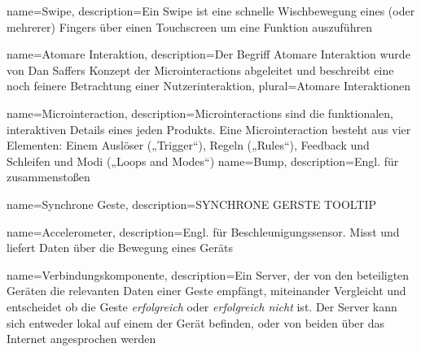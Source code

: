 {
    name=Swipe,
    description={Ein Swipe ist eine schnelle Wischbewegung eines (oder 				mehrerer) Fingers über einen Touchscreen um eine Funktion auszuführen}
}

{
    name=Atomare Interaktion,
    description={Der Begriff Atomare Interaktion wurde von Dan Saffers Konzept 		der Microinteractions abgeleitet und beschreibt eine noch feinere 				Betrachtung einer Nutzerinteraktion},
    plural={Atomare Interaktionen}
}

{
    name=Microinteraction,
    description={Microinteractions sind die funktionalen, interaktiven Details 		eines jeden Produkts. Eine Microinteraction besteht aus vier Elementen: 		Einem Auslöser („Trigger“), Regeln („Rules“), Feedback und Schleifen und 		Modi („Loops and Modes“)}
}
{
	name=Bump,
	description={Engl. für zusammenstoßen}
}

{
	name=Synchrone Geste,
	description={SYNCHRONE GERSTE TOOLTIP}
}

{
	name=Accelerometer,
	description={Engl. für Beschleunigungssensor. Misst und liefert Daten 			über die Bewegung eines Geräts}
}

{
	name=Verbindungskomponente,
	description={Ein Server, der von den beteiligten Geräten die relevanten 		Daten einer Geste empfängt, miteinander Vergleicht und entscheidet ob die 	Geste \textit{erfolgreich} oder \textit{erfolgreich nicht} ist. Der 			Server kann sich entweder lokal auf einem der Gerät befinden, oder von 			beiden über das Internet angesprochen werden}
}